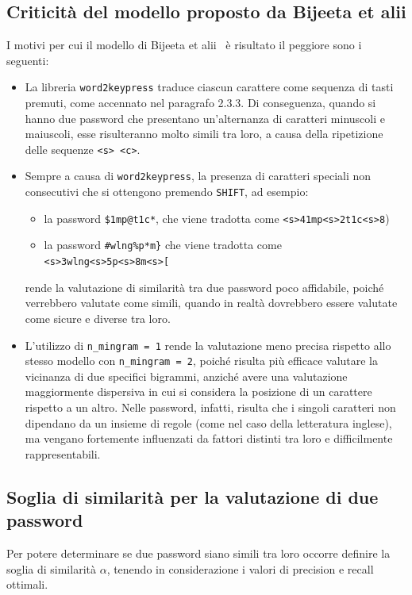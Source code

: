 \subsection{Criticità del modello proposto da Bijeeta et alii}
I motivi per cui il modello di Bijeeta et alii~\cite{biijeta} è risultato il peggiore sono i seguenti:
\begin{itemize}
    \item La libreria \texttt{word2keypress} traduce ciascun carattere come sequenza di tasti premuti, come accennato nel paragrafo 2.3.3. Di conseguenza, quando si hanno due password che presentano un'alternanza di caratteri minuscoli e maiuscoli, esse risulteranno molto simili tra loro, a causa della ripetizione delle sequenze \texttt{<s> <c>}.
    \item Sempre a causa di \texttt{word2keypress}, la presenza di caratteri speciali non consecutivi che si ottengono premendo \texttt{SHIFT}, ad esempio:
    \begin{itemize}
        \item la password \texttt{\$1mp@t1c*}, che viene tradotta come \texttt{<s>41mp<s>2t1c<s>8})
        \item la password \texttt{\#wlng\%p*m\}} che viene tradotta come\\ \texttt{<s>3wlng<s>5p<s>8m<s>[}
    \end{itemize}
    rende la valutazione di similarità tra due password poco affidabile, poiché verrebbero valutate come simili, quando in realtà dovrebbero essere valutate come sicure e diverse tra loro.
    \item L'utilizzo di \texttt{n\_mingram = 1} rende la valutazione meno precisa rispetto allo stesso modello con \texttt{n\_mingram = 2}, poiché risulta più efficace valutare la vicinanza di due specifici bigrammi, anziché avere una valutazione maggiormente dispersiva in cui si considera la posizione di un carattere rispetto a un altro. Nelle password, infatti, risulta che i singoli caratteri non dipendano da un insieme di regole (come nel caso della letteratura inglese), ma vengano fortemente influenzati da fattori distinti tra loro e difficilmente rappresentabili.
\end{itemize}

\subsection{Soglia di similarità per la valutazione di due password}
Per potere determinare se due password siano simili tra loro occorre definire la soglia di similarità $\alpha$, tenendo in considerazione i valori di precision e recall ottimali.

